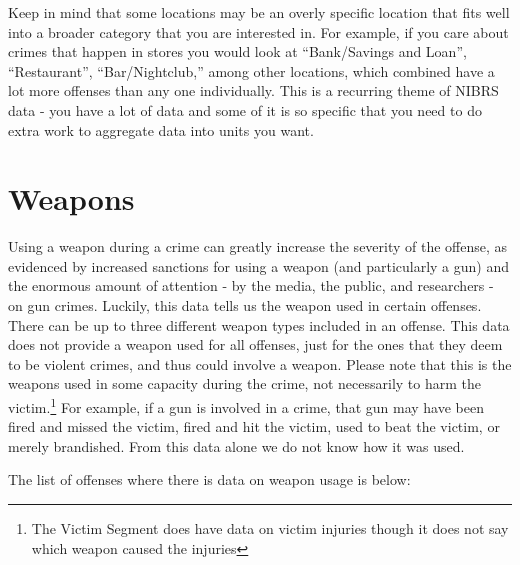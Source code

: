 \documentclass[
]{krantz}
\begin{document}
Keep in mind that some locations may be an overly specific
location that fits well into a broader category that you are
interested in. For example, if you care about crimes that
happen in stores you would look at ``Bank/Savings and
Loan'', ``Restaurant'', ``Bar/Nightclub,'' among other
locations, which combined have a lot more offenses than any
one individually. This is a recurring theme of NIBRS data -
you have a lot of data and some of it is so specific that
you need to do extra work to aggregate data into units you
want.

\section{Weapons}\label{offenseWeapons}

Using a weapon during a crime can greatly increase the
severity of the offense, as evidenced by increased sanctions
for using a weapon (and particularly a gun) and the enormous
amount of attention - by the media, the public, and
researchers - on gun crimes. Luckily, this data tells us the
weapon used in certain offenses. There can be up to three
different weapon types included in an offense. This data
does not provide a weapon used for all offenses, just for
the ones that they deem to be violent crimes, and thus could
involve a weapon. Please note that this is the weapons used
in some capacity during the crime, not necessarily to harm
the victim.\footnote{The Victim Segment does have data on
  victim injuries though it does not say which weapon caused
  the injuries} For example, if a gun is involved in a
crime, that gun may have been fired and missed the victim,
fired and hit the victim, used to beat the victim, or merely
brandished. From this data alone we do not know how it was
used.

The list of offenses where there is data on weapon usage is
below:
\end{document}
